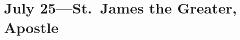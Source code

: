 \documentclass{lbi_organ_bind}
\begin{document}
\chapter{July 25---St.\ James the Greater, Apostle}


\newpage\null\newpage


\end{document}
